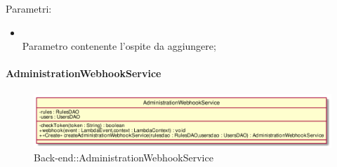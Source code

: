 \begin{itemize}
\begin{itemize}
		Parametri:
		\begin{itemize}
			\item {} \\
			Parametro contenente l'ospite da aggiungere;
		\end{itemize}
	\end{itemize}
\end{itemize}
\FloatBarrier

\hypertarget{AdministrationWebhookService_label}{\paragraph{AdministrationWebhookService}}
\begin{figure}[h]
	\centering
	\includegraphics[width=\textwidth,height=\textheight,keepaspectratio]{images/ClassAdministrationWebhookService.png}
	\caption{Back-end::AdministrationWebhookService}
\end{figure}
